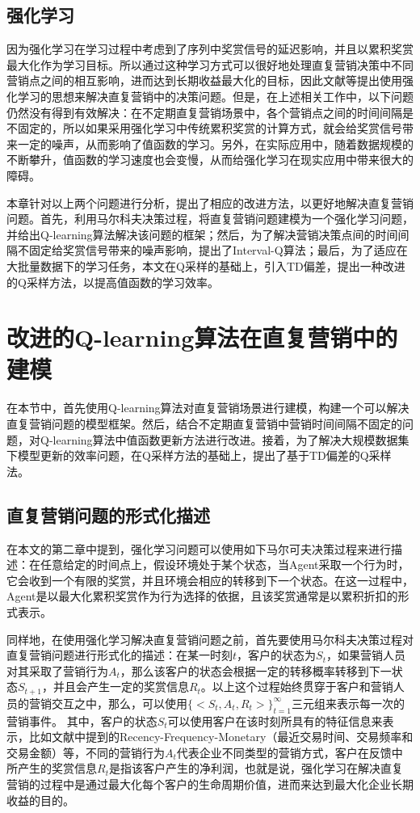 \subsection{强化学习}
因为强化学习在学习过程中考虑到了序列中奖赏信号的延迟影响，并且以累积奖赏最大化作为学习目标。所以通过这种学习方式可以很好地处理直复营销决策中不同营销点之间的相互影响，进而达到长期收益最大化的目标，因此文献\citep{pednault2002sequential,archak2010budget,boutilier2016budget}等提出使用强化学习的思想来解决直复营销中的决策问题。但是，在上述相关工作中，以下问题仍然没有得到有效解决：在不定期直复营销场景中，各个营销点之间的时间间隔是不固定的，所以如果采用强化学习中传统累积奖赏的计算方式，就会给奖赏信号带来一定的噪声，从而影响了值函数的学习。另外，在实际应用中，随着数据规模的不断攀升，值函数的学习速度也会变慢，从而给强化学习在现实应用中带来很大的障碍。

本章针对以上两个问题进行分析，提出了相应的改进方法，以更好地解决直复营销问题。首先，利用马尔科夫决策过程，将直复营销问题建模为一个强化学习问题，并给出Q-learning算法解决该问题的框架；然后，为了解决营销决策点间的时间间隔不固定给奖赏信号带来的噪声影响，提出了Interval-Q算法；最后，为了适应在大批量数据下的学习任务，本文在Q采样的基础上，引入TD偏差，提出一种改进的Q采样方法，以提高值函数的学习效率。

\section{改进的Q-learning算法在直复营销中的建模}
在本节中，首先使用Q-learning算法对直复营销场景进行建模，构建一个可以解决直复营销问题的模型框架。然后，结合不定期直复营销中营销时间间隔不固定的问题，对Q-learning算法中值函数更新方法进行改进。接着，为了解决大规模数据集下模型更新的效率问题，在Q采样方法的基础上，提出了基于TD偏差的Q采样法。

\subsection{直复营销问题的形式化描述}
在本文的第二章中提到，强化学习问题可以使用如下马尔可夫决策过程来进行描述：在任意给定的时间点上，假设环境处于某个状态，当Agent采取一个行为时，它会收到一个有限的奖赏，并且环境会相应的转移到下一个状态。在这一过程中，Agent是以最大化累积奖赏作为行为选择的依据，且该奖赏通常是以累积折扣的形式表示。

同样地，在使用强化学习解决直复营销问题之前，首先要使用马尔科夫决策过程对直复营销问题进行形式化的描述：在某一时刻$t$，客户的状态为$S_{t}$，如果营销人员对其采取了营销行为$A_{t}$，那么该客户的状态会根据一定的转移概率转移到下一状态$S_{t+1}$，并且会产生一定的奖赏信息$R_{t}$。以上这个过程始终贯穿于客户和营销人员的营销交互之中，那么，可以使用$\{<S_{t},A_{t},R_{t}>\}_{t=1}^{\infty}$三元组来表示每一次的营销事件。
其中，客户的状态$S_{t}$可以使用客户在该时刻所具有的特征信息来表示，比如文献\citep{tkachenko2015autonomous}中提到的Recency-Frequency-Monetary（最近交易时间、交易频率和交易金额）等，不同的营销行为$A_{t}$代表企业不同类型的营销方式，客户在反馈中所产生的奖赏信息$R_{t}$是指该客户产生的净利润，也就是说，强化学习在解决直复营销的过程中是通过最大化每个客户的生命周期价值，进而来达到最大化企业长期收益的目的。

